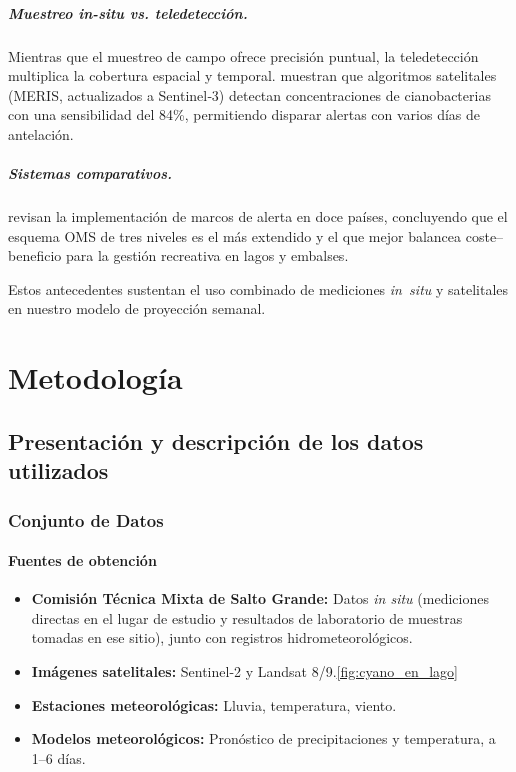 \documentclass[
  11pt,
  pdftitle=TFI - Tschopp Joaquín S.,
  pdfauthor=Tschopp Joaquín S.,
  pdfcreator=LaTeX with hyperref,
]{report}  %
\begin{document}
\paragraph{Muestreo in-situ vs. teledetección.}
Mientras que el muestreo de campo ofrece precisión puntual, la
teledetección multiplica la cobertura espacial y temporal.
\cite{Stumpf2016} muestran que algoritmos satelitales (MERIS,
actualizados a Sentinel‑3) detectan concentraciones de cianobacterias
con una sensibilidad del 84\%, permitiendo disparar alertas con varios
días de antelación.

\paragraph{Sistemas comparativos.}
\cite{Hunter2022} revisan la implementación de marcos de alerta en
doce países, concluyendo que el esquema OMS de tres niveles es el más
extendido y el que mejor balancea coste–beneficio para la gestión
recreativa en lagos y embalses.

Estos antecedentes sustentan el uso combinado de mediciones
\textit{in situ} y satelitales en nuestro modelo de proyección semanal.

\chapter{Metodología}

\section{Presentación y descripción de los datos utilizados}
\subsection{Conjunto de Datos}

\subsubsection{Fuentes de obtención}
\begin{itemize}[noitemsep]
    \item \textbf{Comisión Técnica Mixta de Salto Grande:} Datos \textit{in situ} (mediciones directas en el lugar de estudio y resultados de laboratorio de muestras tomadas en ese sitio), junto con registros hidrometeorológicos.
    \item \textbf{Imágenes satelitales:} Sentinel-2 y Landsat 8/9.\ref{fig:cyano_en_lago}
    \item \textbf{Estaciones meteorológicas:} Lluvia, temperatura, viento.
    \item \textbf{Modelos meteorológicos:} Pronóstico de precipitaciones y temperatura, a 1–6 días.
\end{itemize}
\end{document}
